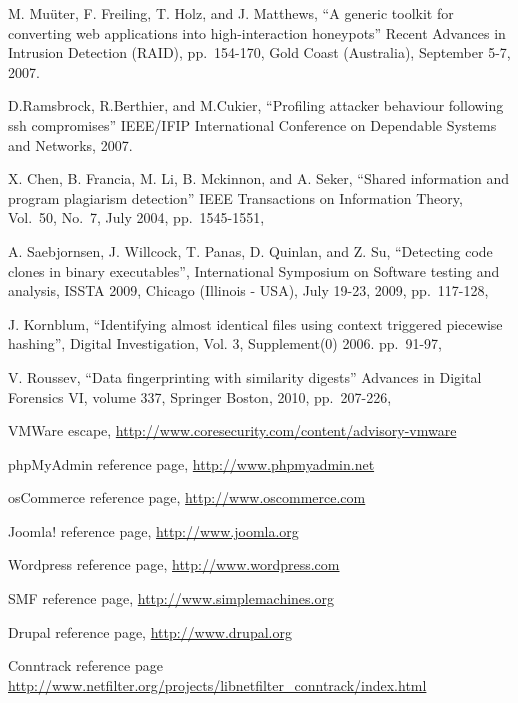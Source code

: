 \begin{thebibliography}{99}
M. Muüter, F. Freiling, T. Holz, and J. Matthews,
``A generic toolkit for converting web applications into high-interaction honeypots''
Recent Advances in Intrusion Detection (RAID),
pp.\ 154-170,
Gold Coast (Australia), September 5-7, 2007.

D.Ramsbrock, R.Berthier, and M.Cukier,
``Profiling attacker behaviour following ssh compromises''
IEEE/IFIP International Conference on Dependable Systems and Networks, 2007.

X. Chen, B. Francia, M. Li, B. Mckinnon, and A. Seker,
``Shared information and program plagiarism detection''
IEEE Transactions on Information Theory,
Vol.\ 50, No.\ 7,
July 2004,
pp.\ 1545-1551,

A. Saebjornsen, J. Willcock, T. Panas, D. Quinlan, and Z. Su,
``Detecting code clones in binary executables'',
International Symposium on Software testing and analysis, ISSTA 2009,
 Chicago (Illinois - USA), July 19-23, 2009,
pp.\ 117-128,

J. Kornblum,
``Identifying almost identical files using context triggered piecewise hashing'',
Digital Investigation,
Vol. 3, Supplement(0)
2006.
pp.\ 91-97,

V. Roussev,
``Data fingerprinting with similarity digests''
Advances in Digital Forensics VI, volume 337,
Springer Boston, 2010,
pp.\ 207-226,

VMWare escape, %
\url{http://www.coresecurity.com/content/advisory-vmware} %

phpMyAdmin reference page,
\url{http://www.phpmyadmin.net}

osCommerce reference page,
\url{http://www.oscommerce.com}

Joomla! reference page,
\url{http://www.joomla.org}

Wordpress reference page,
\url{http://www.wordpress.com}

SMF reference page,
\url{http://www.simplemachines.org}

Drupal reference page,
\url{http://www.drupal.org}

Conntrack reference page
\url{http://www.netfilter.org/projects/libnetfilter_conntrack/index.html}


\end{thebibliography}
